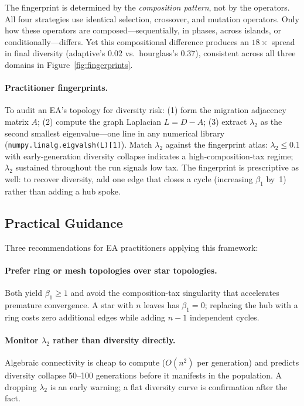 \documentclass[dvipsnames,format=sigconf,anonymous=false,review=false]{acmart}
\begin{document}
The fingerprint is determined by the \emph{composition pattern}, not by the operators.
All four strategies use identical selection, crossover, and mutation operators.
Only how these operators are composed---sequentially, in phases, across islands, or conditionally---differs.
Yet this compositional difference produces an $18\times$ spread in final diversity (adaptive's 0.02 vs.\ hourglass's 0.37), consistent across all three domains in Figure~\ref{fig:fingerprints}.

\paragraph{Practitioner fingerprints.}
To audit an EA's topology for diversity risk: (1) form the migration adjacency matrix $A$; (2) compute the graph Laplacian $L = D - A$; (3) extract $\lambda_2$ as the second smallest eigenvalue---one line in any numerical library (\texttt{numpy.linalg.eigvalsh(L)[1]}). Match $\lambda_2$ against the fingerprint atlas: $\lambda_2 \leq 0.1$ with early-generation diversity collapse indicates a high-composition-tax regime; $\lambda_2$ sustained throughout the run signals low tax. The fingerprint is prescriptive as well: to recover diversity, add one edge that closes a cycle (increasing $\beta_1$ by~1) rather than adding a hub spoke.

\subsection{Practical Guidance}

Three recommendations for EA practitioners applying this framework:

\paragraph{Prefer ring or mesh topologies over star topologies.} Both yield $\beta_1 \geq 1$ and avoid the composition-tax singularity that accelerates premature convergence. A star with $n$ leaves has $\beta_1 = 0$; replacing the hub with a ring costs zero additional edges while adding $n-1$ independent cycles.

\paragraph{Monitor $\lambda_2$ rather than diversity directly.} Algebraic connectivity is cheap to compute ($O(n^2)$ per generation) and predicts diversity collapse 50--100 generations before it manifests in the population. A dropping $\lambda_2$ is an early warning; a flat diversity curve is confirmation after the fact.
\end{document}
